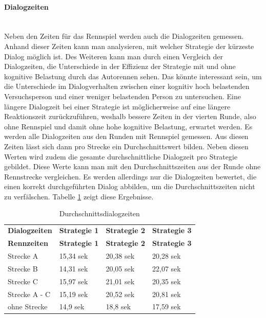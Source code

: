\documentclass[12pt,a4paper]{scrartcl}
\begin{document}
\paragraph{Dialogzeiten}
~\\
Neben den Zeiten für das Rennspiel werden auch die Dialogzeiten gemessen. Anhand dieser Zeiten kann man analysieren, mit welcher Strategie der kürzeste Dialog möglich ist. Des Weiteren kann man durch einen Vergleich der Dialogzeiten, die Unterschiede in der Effizienz der Strategie mit und ohne kognitive Belastung durch das Autorennen sehen. Das könnte interessant sein, um die Unterschiede im Dialogverhalten zwischen einer kognitiv hoch belastenden Versuchsperson und einer weniger belastenden Person zu untersuchen. Eine längere Dialogzeit bei einer Strategie ist möglicherweise auf eine längere Reaktionszeit zurückzuführen, weshalb bessere Zeiten in der vierten Runde, also ohne Rennspiel und damit ohne hohe kognitive Belastung, erwartet werden. Es werden alle Dialogzeiten aus den Runden mit Rennspiel gemessen. Aus diesen Zeiten lässt sich dann pro Strecke ein Durchschnittswert bilden. Neben diesen Werten wird zudem die gesamte durchschnittliche Dialogzeit pro Strategie gebildet. Diese Werte kann man mit den Durchschnittszeiten aus der Runde ohne Rennstrecke vergleichen. Es werden allerdings nur die Dialogzeiten bewertet, die einen korrekt durchgeführten Dialog abbilden, um die Durchschnittszeiten nicht zu verfälschen.  Tabelle \ref{Durchschnittsdialogzeiten1} zeigt diese Ergebnisse.

\begin{longtable}{p{3cm}p{3cm}p{3cm}p{3cm} }
	\label{Durchschnittsdialogzeiten1}\\
	\caption[Durchschnittsdialogzeiten]{Durchschnittsdialogzeiten}\\
	\hline
	\textbf{Dialogzeiten}&\textbf{Strategie 1}&\textbf{Strategie 2} &\textbf{Strategie 3}\\
	\hline
	\endfirsthead
	\hline
	\textbf{Rennzeiten}&\textbf{Strategie 1}&\textbf{Strategie 2} &\textbf{Strategie 3}\\
	\hline
	\endhead
Strecke A & 15,34 sek & 20,38 sek & 20,28 sek \\
Strecke B & 14,31 sek & 20,05 sek & 22,07 sek \\
Strecke C  & 15,97 sek & 21,01 sek & 20,35 sek \\
\hline
\hline
Strecke A - C & 15,19 sek & 20,52 sek & 20,81 sek \\
\hline
ohne Strecke &  14,9 sek & 18,8 sek & 17,59 sek \\
\hline
\end{longtable}
\end{document}
